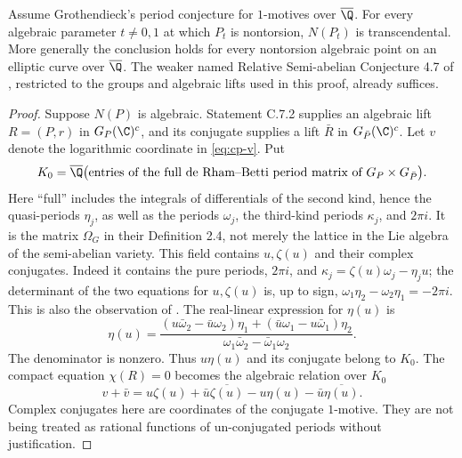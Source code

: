 \begin{statement}
Assume Grothendieck's period conjecture for $1$-motives over
$\overline\Q$. For every algebraic parameter $t\ne0,1$ at
which $P_t$ is nontorsion, $N(P_t)$ is transcendental.
More generally the conclusion holds for every nontorsion
algebraic point on an elliptic curve over $\overline\Q$.
The weaker named Relative Semi-abelian Conjecture 4.7 of
\citet{bertolin2022}, restricted to the groups and algebraic
lifts used in this proof, already suffices.
\end{statement}
\begin{proof}
Suppose $N(P)$ is algebraic. Statement C.7.2 supplies an
algebraic lift $R=(P,r)$ in $G_P(\C)^c$, and its conjugate
supplies a lift $\bar R$ in $G_{\bar P}(\C)^c$.
Let $v$ denote the logarithmic coordinate in
\eqref{eq:cp-v}. Put
\[
 K_0=\overline\Q\bigl(\text{entries of the full de Rham--Betti
                    period matrix of }G_P\times G_{\bar P}\bigr).
\]
Here ``full'' includes the integrals of differentials of the second
kind, hence the quasi-periods $\eta_j$, as well as the periods
$\omega_j$, the third-kind periods $\kappa_j$, and $2\pi i$.
It is the matrix $\Omega_G$ in their Definition 2.4, not merely
the lattice in the Lie algebra of the semi-abelian variety.
This field contains $u,\zeta(u)$ and their complex conjugates.
Indeed it contains the pure periods, $2\pi i$, and
$\kappa_j=\zeta(u)\omega_j-\eta_j u$; the determinant of
the two equations for $u,\zeta(u)$ is, up to sign,
$\omega_1\eta_2-\omega_2\eta_1= -2\pi i$.
This is also the observation of \citet[Remark 4.13]{bertolin2022}.
The real-linear expression for $\eta(u)$ is
\begin{equation}\label{eq:cp-real-linear}
 \eta(u)=
 \frac{(u\bar\omega_2-\bar u\omega_2)\eta_1
       +(\bar u\omega_1-u\bar\omega_1)\eta_2}
      {\omega_1\bar\omega_2-\bar\omega_1\omega_2}.
\end{equation}
The denominator is nonzero. Thus $u\eta(u)$ and its conjugate
belong to $K_0$. The compact equation $\chi(R)=0$ becomes
the algebraic relation over $K_0$
\begin{equation}\label{eq:cp-relation}
 v+\bar v
 =u\zeta(u)+\bar u\overline{\zeta(u)}
                -u\eta(u)-\bar u\overline{\eta(u)}.
\end{equation}
Complex conjugates here are coordinates of the conjugate
$1$-motive. They are not being treated as rational functions
of un-conjugated periods without justification.


\end{proof}
